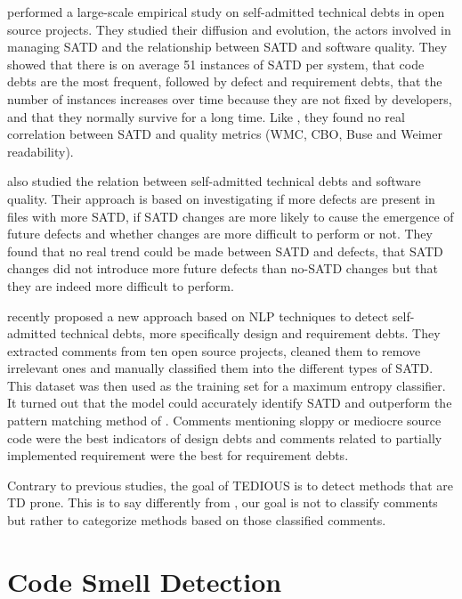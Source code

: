 \citet{BavotaR16} performed a large-scale empirical study on self-admitted technical debts in open source projects. They studied their diffusion and evolution, the actors involved in managing \ac{SATD} and the relationship between \ac{SATD} and software quality. They showed that there is on average 51 instances of \ac{SATD} per system, that code debts are the most frequent, followed by defect and requirement debts, that the number of instances increases over time because they are not fixed by developers, and that they normally survive for a long time. Like \citet{griffith2014correspondence}, they found no real correlation between \ac{SATD} and quality metrics (\ac{WMC}, \ac{CBO}, Buse and Weimer readability). \par

\citet{wehaibi2016examining} also studied the relation between self-admitted technical debts and software quality. Their approach is based on investigating if more defects are present in files with more \ac{SATD}, if \ac{SATD} changes are more likely to cause the emergence of future defects and whether changes are more difficult to perform or not. They found that no real trend could be made between \ac{SATD} and defects, that \ac{SATD} changes did not introduce more future defects than no-\ac{SATD} changes but that they are indeed more difficult to perform. \par

\citet{MaldonadoNLP} recently proposed a new approach based on \ac{NLP} techniques to detect self-admitted technical debts, more specifically design and requirement debts. They extracted comments from ten open source projects, cleaned them to remove irrelevant ones and manually classified them into the different types of \ac{SATD}. This dataset was then used as the training set for a maximum entropy classifier. It turned out that the model could accurately identify \ac{SATD} and outperform the pattern matching method of \citet{PotdarS14}. Comments mentioning sloppy or mediocre source code were the best indicators of design debts and comments related to partially implemented requirement were the best for requirement debts. \par

Contrary to previous studies, the goal of TEDIOUS is to detect methods that are TD prone. This is to say differently from \citet{MaldonadoS15}, our goal is not to classify comments but rather to categorize methods based on those classified comments.

\section{Code Smell Detection}


